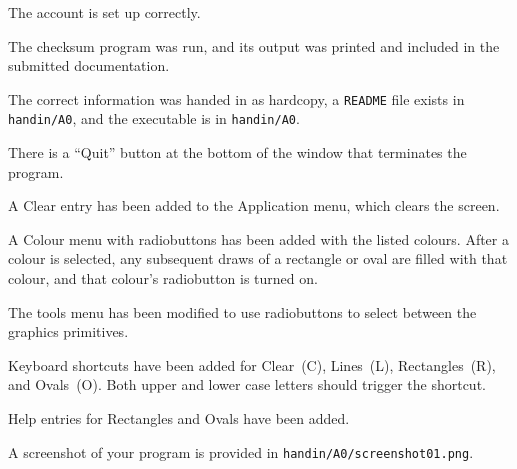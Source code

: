  \bigskip

 \bigskip

 \bigskip

\begin{description}
\large
        \item[\_\_\_ 1:]{
            The account is set up correctly.
        }
        \item[\_\_\_ 2:]{
            The checksum program was run, and its output was printed 
            and included in the submitted documentation.
        }
        \item[\_\_\_ 3:]{
            The correct information was handed in as hardcopy, 
                a {\tt README} file exists in \texttt{handin/A0},
                and the executable is in \texttt{handin/A0}.
        }
        \item[\_\_\_ 4:]{
                There is a ``Quit'' button at the bottom
                of the window that terminates the program.
        }
        \item[\_\_\_ 5:]{
                A Clear entry has been added to the Application menu, which
                clears the screen.
        }
        \item[\_\_\_ 6:]{
                A Colour menu with radiobuttons
		has been added with the listed colours.
                After a colour is selected, any subsequent draws of
                a rectangle or oval are filled with that colour,
		and that colour's radiobutton is turned on.
        }
        \item[\_\_\_ 7:]{
                The tools menu has been modified to use radiobuttons
                to select between the graphics primitives.
        }
        \item[\_\_\_ 8:]{
                Keyboard shortcuts have been added for 
                Clear~(C), Lines~(L), Rectangles~(R), and Ovals~(O).
		Both upper and lower case letters should trigger the shortcut.
        }
        \item[\_\_\_ 9:]{
                Help entries for Rectangles and Ovals have been added.
        }
        \item[\_\_\_ 10:]{
            A screenshot of your program is provided in
		{\tt handin/A0/screenshot01.png}.
        }
\end{description}


